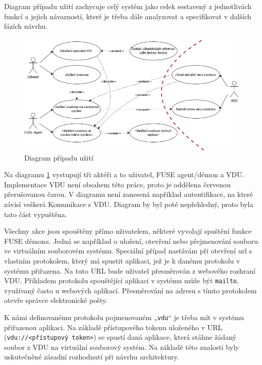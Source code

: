 Diagram případu užití zachycuje celý systém jako celek sestavený z jednotlivách funkcí a jejich návazností, které je třeba dále analyzovat a specifikovat v dalších
fázích návrhu.

\begin{figure}[h]
    \centering    
    \includegraphics[width=1\linewidth]{other-fig/use_case_diagram.png}
    \caption{Diagram případu užití}
    \label{fig:use_case}
\end{figure}

Na diagramu \ref{fig:use_case} vystupují tři aktéři a to uživatel, FUSE agent/démon a VDU. Implementace VDU není obsahem této práce, proto je oddělena červenou
přerušovanou čarou. V diagramu není zanesená například autentifikace, na které závisí veškerá Komunikace s VDU. Diagram by byl poté nepřehledný, proto byla tato
část vypuštěna.

Všechny akce jsou spouštěny přímo uživatelem, některé vyvolají spuštění funkce FUSE démona. Jedná se například o uložení, otevření nebo přejmenování souboru ve virtuálním
souborovém systému. Speciální případ nastávám při otevření url s vlastním protokolem, který má spustit aplikaci, jež je k danému protokolu v systému přiřazena.
Na tuto URL bude uživatel přesměrován z webového rozhraní VDU. Příkladem protokolu spouštějící aplikaci v systému může být \texttt{mailto}, využívaný často u webových aplikací.
Přesměrování na adresu s tímto protokolem otevře správce elektronické pošty. 

K námi definovanému protokolu pojmenovaném „\texttt{vdu}“ je třeba mít v systému přiřazenou aplikaci. Na základě přístupového tokenu uloženého v URL 
(\texttt{vdu://<přístupový token>}) se spustí daná aplikace, která stáhne žádaný soubor z VDU na virtuální souborový systém. Na základě této znalosti byly
uskutečněné zásadní rozhodnutí při návrhu architektury.
 
